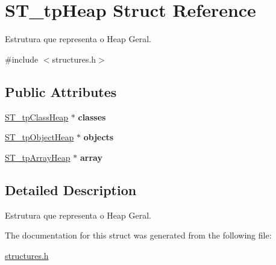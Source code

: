 \hypertarget{structST__tpHeap}{}\section{S\+T\+\_\+tp\+Heap Struct Reference}
\label{structST__tpHeap}


Estrutura que representa o Heap Geral.  




{\ttfamily \#include $<$structures.\+h$>$}

\subsection*{Public Attributes}
\begin{DoxyCompactItemize}
\item 
\mbox{\label{structST__tpHeap_afb6a183fbb02b4f5c53b0355fa540e25}} 
\mbox{\hyperlink{structures_8h_a36c151ce2aec3e5a7150c6d3478723a5}{S\+T\+\_\+tp\+Class\+Heap}} $\ast$ {\bfseries classes}
\item 
\mbox{\label{structST__tpHeap_a9ef91e8503a3603f0f62b2f898d75cd0}} 
\mbox{\hyperlink{structures_8h_a3900130849091c366c32df1a3af32bfe}{S\+T\+\_\+tp\+Object\+Heap}} $\ast$ {\bfseries objects}
\item 
\mbox{\label{structST__tpHeap_a15360615ff89cf492d60d31512a1c0bd}} 
\mbox{\hyperlink{structures_8h_a9da06389548e0b5bfa02d07cf8b5c99e}{S\+T\+\_\+tp\+Array\+Heap}} $\ast$ {\bfseries array}
\end{DoxyCompactItemize}


\subsection{Detailed Description}
Estrutura que representa o Heap Geral. 

The documentation for this struct was generated from the following file\+:\begin{DoxyCompactItemize}
\item 
\mbox{\hyperlink{structures_8h}{structures.\+h}}\end{DoxyCompactItemize}
